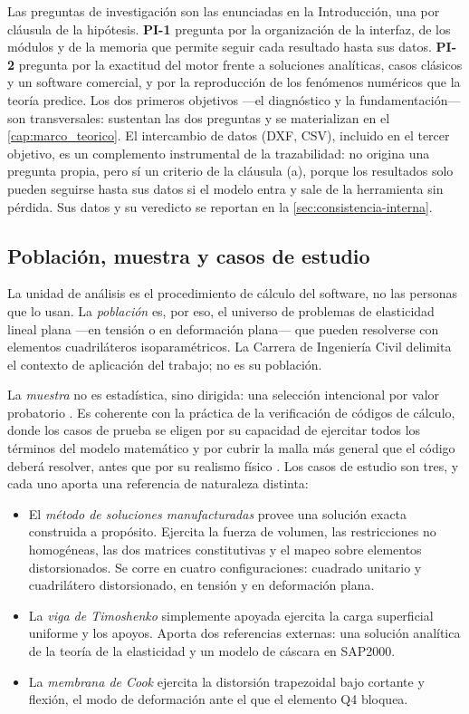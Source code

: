 Las preguntas de investigación son las enunciadas en la Introducción, una por cláusula de la hipótesis. \textbf{PI-1} pregunta por la organización de la interfaz, de los módulos y de la memoria que permite seguir cada resultado hasta sus datos. \textbf{PI-2} pregunta por la exactitud del motor frente a soluciones analíticas, casos clásicos y un software comercial, y por la reproducción de los fenómenos numéricos que la teoría predice. Los dos primeros objetivos —el diagnóstico y la fundamentación— son transversales: sustentan las dos preguntas y se materializan en el \autoref{cap:marco_teorico}. El intercambio de datos (DXF, CSV), incluido en el tercer objetivo, es un complemento instrumental de la trazabilidad: no origina una pregunta propia, pero sí un criterio de la cláusula (a), porque los resultados solo pueden seguirse hasta sus datos si el modelo entra y sale de la herramienta sin pérdida. Sus datos y su veredicto se reportan en la \autoref{sec:consistencia-interna}.

\subsection{Población, muestra y casos de estudio}
\label{sec:poblacion}

La unidad de análisis es el procedimiento de cálculo del software, no las personas que lo usan. La \emph{población} es, por eso, el universo de problemas de elasticidad lineal plana —en tensión o en deformación plana— que pueden resolverse con elementos cuadriláteros isoparamétricos. La Carrera de Ingeniería Civil delimita el contexto de aplicación del trabajo; no es su población.

La \emph{muestra} no es estadística, sino dirigida: una selección intencional por valor probatorio \autocite[p.~215]{sampieri2018metodologia}. Es coherente con la práctica de la verificación de códigos de cálculo, donde los casos de prueba se eligen por su capacidad de ejercitar todos los términos del modelo matemático y por cubrir la malla más general que el código deberá resolver, antes que por su realismo físico \autocite[pp.~190, 208]{oberkampf2010vv}. Los casos de estudio son tres, y cada uno aporta una referencia de naturaleza distinta:

\begin{itemize}
    \item El \emph{método de soluciones manufacturadas} provee una solución exacta construida a propósito. Ejercita la fuerza de volumen, las restricciones no homogéneas, las dos matrices constitutivas y el mapeo sobre elementos distorsionados. Se corre en cuatro configuraciones: cuadrado unitario y cuadrilátero distorsionado, en tensión y en deformación plana.
    \item La \emph{viga de Timoshenko} simplemente apoyada ejercita la carga superficial uniforme y los apoyos. Aporta dos referencias externas: una solución analítica de la teoría de la elasticidad y un modelo de cáscara en SAP2000.
    \item La \emph{membrana de Cook} ejercita la distorsión trapezoidal bajo cortante y flexión, el modo de deformación ante el que el elemento Q4 bloquea.
\end{itemize}

